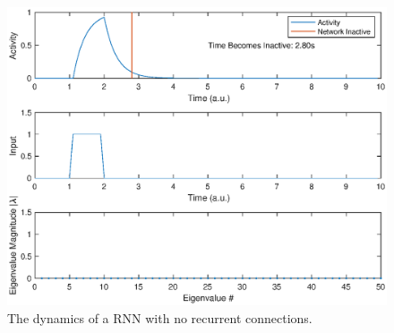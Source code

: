 \documentclass[11pt, oneside]{article}
\begin{document}
\begin{figure}[ht!]
\includegraphics[width=1\textwidth]{RNNnoR.eps}
\caption{The dynamics of a RNN with no recurrent connections.}
\label{fig:RNNnoR}
\end{figure}
\end{document}
